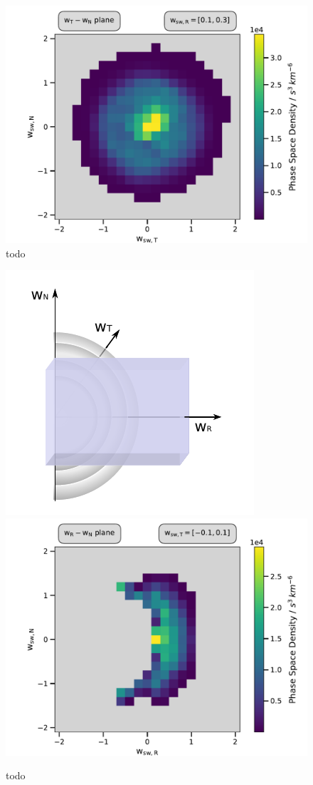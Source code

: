 \begin{figure}[h]
	\includegraphics[width=.8\textwidth]{Figures/cart_long_ps.pdf}
	\centering
	\caption{todo}
	\label{fig:psd_lang}
\end{figure}






\begin{figure}[h]
	\includegraphics[width=.4\textwidth]{Figures/sketch_slice_T2.pdf}
	\includegraphics[scale=.45]{Figures/slice_50_T.pdf}
	\centering
	\caption{todo}
	\label{fig:sketch_slice_T}
\end{figure}

